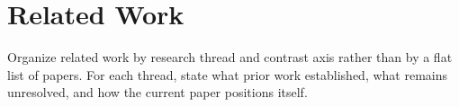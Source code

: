 \section{Related Work}

Organize related work by research thread and contrast axis rather than by a flat list of papers. For each thread, state what prior work established, what remains unresolved, and how the current paper positions itself.

